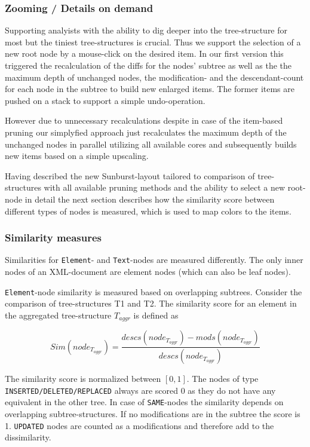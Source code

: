 \subsubsection{Zooming / Details on demand} 
Supporting analyists with the ability to dig deeper into the tree-structure for most but the tiniest tree-structures is crucial. Thus we support the selection of a new root node by a mouse-click on the desired item. In our first version this triggered the recalculation of the diffs for the nodes' subtree as well as the the maximum depth of unchanged nodes, the modification- and the descendant-count for each node in the subtree to build new enlarged items. The former items are pushed on a stack to support a simple undo-operation.

However due to unnecessary recalculations despite in case of the item-based pruning our simplyfied approach just recalculates the maximum depth of the unchanged nodes in parallel utilizing all available cores and subsequently builds new items based on a simple upscaling.

Having described the new Sunburst-layout tailored to comparison of tree-structures with all available pruning methods and the ability to select a new root-node in detail the next section describes how the similarity score between different types of nodes is measured, which is used to map colors to the items.

\subsubsection{Similarity measures}
Similarities for \texttt{Element}- and \texttt{Text}-nodes are measured differently. The only inner nodes of an XML-document are element nodes (which can also be leaf nodes).

\texttt{Element}-node similarity is measured based on overlapping subtrees. Consider the comparison of tree-structures T1 and T2. The similarity score for an element in the aggregated tree-structure $T_{aggr}$ is defined as

\begin{equation}
Sim(node_{T_{aggr}}) = \frac{descs(node_{T_{aggr}}) - mods(node_{T_{aggr}})}{descs(node_{T_{aggr}})}
\end{equation}

The similarity score is normalized between $[0, 1]$. The nodes of type\\ \texttt{INSERTED/DELETED/REPLACED} always are scored 0 as they do not have any equivalent in the other tree. In case of \texttt{SAME}-nodes the similarity depends on overlapping subtree-structures. If no modifications are in the subtree the score is 1. \texttt{UPDATED} nodes are counted as a modifications and therefore add to the dissimilarity.

